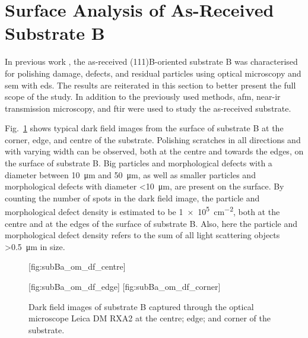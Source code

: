 \clearpage
\section{Surface Analysis of As-Received Substrate B}\label{sec:subBa}
In previous work \citep{lauten2017characterisation}, the as-received (111)B-oriented substrate B was characterised for polishing damage, defects, and residual particles using optical microscopy and \ac{sem} with \ac{eds}. The results are reiterated in this section to better present the full scope of the study. In addition to the previously used methods, \ac{afm}, near-\ac{ir} transmission microscopy, and \ac{ftir} were used to study the as-received substrate.

Fig.~\ref{fig:subBa_om_df} shows typical dark field images from the surface of substrate B at the corner, edge, and centre of the substrate. Polishing scratches in all directions and with varying width can be observed, both at the centre and towards the edges, on the surface of substrate B. Big particles and morphological defects with a diameter between \SI{10}{\micro\metre} and \SI{50}{\micro\metre}, as well as smaller particles and morphological defects with diameter \SI{<10}{\micro\metre}, are present on the surface. By counting the number of spots in the dark field image, the particle and morphological defect density is estimated to be \SI{1e5}{\centi\metre^{-2}}, both at the centre and at the edges of the surface of substrate B. Also, here the particle and morphological defect density refers to the sum of all light scattering objects \SI{>0.5}{\micro\metre} in size.

\begin{figure}[htbp]
    \centering
    [fig:subBa_om_df_centre]
    \par\bigskip
    [fig:subBa_om_df_edge]
    \hfill
    [fig:subBa_om_df_corner]
    \caption[Dark field images of substrate B.]{Dark field images of substrate B captured through the optical microscope Leica DM RXA2 at the  centre;  edge; and  corner of the substrate.}
    \label{fig:subBa_om_df}
\end{figure}

